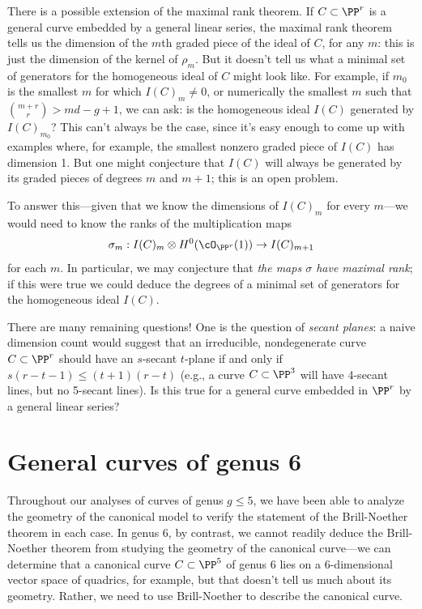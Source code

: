 There is a possible extension of the maximal rank theorem. If $C \subset \PP^r$ is a general curve embedded by a general linear series, the maximal rank theorem tells us the dimension of the $m$th graded piece of the ideal of $C$, for any $m$: this is just the dimension of the kernel of $\rho_m$. But it doesn't tell us what a minimal set of generators for the homogeneous ideal of $C$ might look like. For example, if $m_0$ is the smallest $m$ for which $I(C)_m \neq 0$, or numerically the smallest $m$ such that $\binom{m+r}{r} > md-g+1$, we can ask: is the homogeneous ideal $I(C)$ generated by $I(C)_{m_0}$? This can't always be the case, since it's easy enough to come up with examples where, for example, the  smallest nonzero graded piece of $I(C)$ has dimension 1. But one might conjecture that $I(C)$ will always be generated by its graded pieces of degrees $m$ and $m+1$; this is an open problem.

To answer this---given that we know the dimensions of $I(C)_m$ for every $m$---we would need to know the ranks of the multiplication maps
$$
\sigma_m : I(C)_m \otimes H^0(\cO_{\PP^r}(1)) \to I(C)_{m+1}
$$
for each $m$. In particular, we may conjecture that \emph{the maps $\sigma$ have maximal rank}; if this were true we could deduce the degrees of a minimal set of generators for the homogeneous ideal $I(C)$.


There are many remaining questions! One is the question of \emph{secant planes}: a naive dimension count would suggest that an irreducible, nondegenerate curve $C \subset \PP^r$ should have an $s$-secant $t$-plane if and only if $s(r-t-1) \leq (t+1)(r-t)$
(e.g., a curve $C \subset \PP^3$ will have 4-secant lines, but no 5-secant lines). Is this true for a general curve embedded in $\PP^r$ by a general linear series?



\section{General curves of genus 6}\label{genus 6 section}


Throughout our analyses of curves of genus $g \leq 5$, we have been able to analyze the geometry of the canonical model to verify the statement of the Brill-Noether theorem in each case. In genus 6, by contrast, we cannot readily deduce the Brill-Noether theorem from studying the geometry of the canonical curve---we can determine that a canonical curve $C \subset \PP^5$ of genus 6 lies on a 6-dimensional vector space of quadrics, for example, but that doesn't tell us much about its geometry. Rather, we need to use Brill-Noether to describe the canonical curve. 

